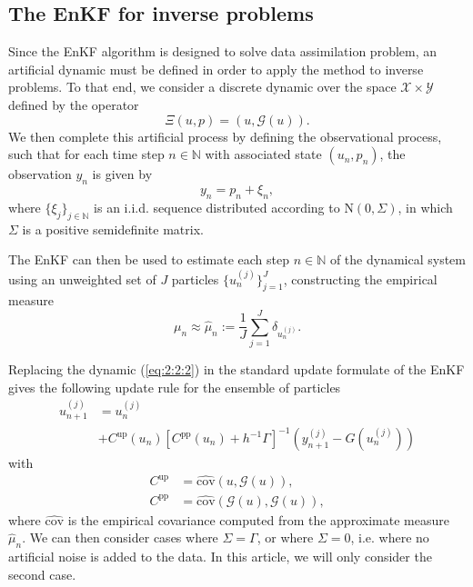 \documentclass[a4paper,twocolumn,10pt]{article}
\begin{document}
\subsection{The EnKF for inverse problems} \label{subsec:2:2}
Since the EnKF algorithm is designed to solve data assimilation problem, an artificial dynamic must be
defined in order to apply the method to inverse problems. To that end, we consider a discrete dynamic
over the space $\mathcal{X} \times \mathcal{Y}$ defined by the operator
\begin{equation} \label{eq:2:2:1}
    \Xi(u, p) = (u, \mathcal{G}(u)).
\end{equation}
We then complete this artificial process by defining the observational process, such that for each
time step $n \in \mathbb{N}$ with associated state $(u_n, p_n)$, the observation $y_n$ is given by
\begin{equation} \label{eq:2:2:2}
    y_n = p_n + \xi_n,
\end{equation}
where $\{\xi_j\}_{j\in \mathbb{N}}$ is an i.i.d. sequence distributed according to $\text{N}(0, \Sigma)$,
in which $\Sigma$ is a positive semidefinite matrix.

The EnKF can then be used to estimate each step $n \in \mathbb{N}$ of the dynamical system using an
unweighted set of $J$ particles $\{u_n^{(j)}\}_{j = 1}^J$, constructing the empirical measure
\begin{equation} \label{eq:2:2:3}
    \mu_n \approx \hat{\mu}_n := \frac1J\sum_{j=1}^J \delta_{u_n^{(j)}}.
\end{equation}

Replacing the dynamic (\ref{eq:2:2:2}) in the standard update formulate of the EnKF gives the
following update rule for the ensemble of particles
\begin{equation} \label{eq:2:2:4}
    \begin{aligned}
    u_{n+1}^{(j)} &= u_{n}^{(j)} \\
    &+ C^{\text{up}}(u_n)[C^{\text{pp}}(u_n) + h^{-1}\Gamma]^{-1}(y_{n+1}^{(j)} - G(u_n^{(j)}))
    \end{aligned}
\end{equation}
with 
\begin{equation}
    \begin{aligned}
        C^{\text{up}} &= \hat{\text{cov}}(u, \mathcal{G}(u)),\\
        C^{\text{pp}} &= \hat{\text{cov}}(\mathcal{G}(u), \mathcal{G}(u)),
    \end{aligned}
\end{equation}
where $\hat{\text{cov}}$ is the empirical covariance computed from the approximate measure $\hat{\mu}_n$.
We can then consider cases where $\Sigma = \Gamma$, or where $\Sigma = 0$, i.e. where no artificial noise
is added to the data. In this article, we will only consider the second case.
\end{document}
